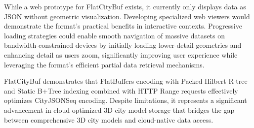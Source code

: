 While a web prototype for FlatCityBuf exists, it currently only displays data as JSON without geometric visualization. Developing specialized web viewers would demonstrate the format's practical benefits in interactive contexts. Progressive loading strategies could enable smooth navigation of massive datasets on bandwidth-constrained devices by initially loading lower-detail geometries and enhancing detail as users zoom, significantly improving user experience while leveraging the format's efficient partial data retrieval mechanisms.

FlatCityBuf demonstrates that FlatBuffers encoding with Packed Hilbert R-tree and Static B+Tree indexing combined with HTTP Range requests effectively optimizes CityJSONSeq encoding. Despite limitations, it represents a significant advancement in cloud-optimized 3D city model storage that bridges the gap between comprehensive 3D city models and cloud-native data access.
